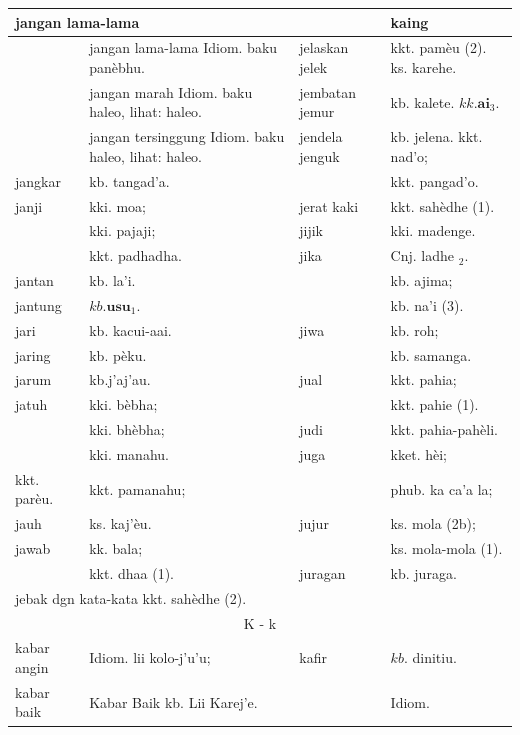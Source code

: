\documentclass[10pt]{article}
\begin{document}
\begin{center}
\begin{tabular}{|l|l|l|l|}
\hline
\multicolumn{3}{|l|}{jangan lama-lama} & kaing \\
\hline
 & jangan lama-lama Idiom. baku panèbhu. & jelaskan jelek & kkt. pamèu (2). ks. karehe. \\
\hline
 & jangan marah Idiom. baku haleo, lihat: haleo. & jembatan jemur & kb. kalete. \(k k . \mathbf{a i}_{3}\). \\
\hline
 & jangan tersinggung Idiom. baku haleo, lihat: haleo. & jendela jenguk & kb. jelena. kkt. nad'o; \\
\hline
jangkar & kb. tangad'a. &  & kkt. pangad'o. \\
\hline
janji & kki. moa; & jerat kaki & kkt. sahèdhe (1). \\
\hline
 & kki. pajaji; & jijik & kki. madenge. \\
\hline
 & kkt. padhadha. & jika & Cnj. ladhe \({ }_{2}\). \\
\hline
jantan & kb. la'i. &  & kb. ajima; \\
\hline
jantung & \(k b . \mathbf{u s u}_{1}\). &  & kb. na'i (3). \\
\hline
jari & kb. kacui-aai. & jiwa & kb. roh; \\
\hline
jaring & kb. pèku. &  & kb. samanga. \\
\hline
jarum & kb.j'aj'au. & jual & kkt. pahia; \\
\hline
jatuh & kki. bèbha; &  & kkt. pahie (1). \\
\hline
\multirow{2}{*}{} & kki. bhèbha; & judi & kkt. pahia-pahèli. \\
\hline
\multirow{2}{*}{} & kki. manahu. & juga & kket. hèi; \\
\hline
kkt. parèu. & kkt. pamanahu; &  & phub. ka ca'a la; \\
\hline
jauh & ks. kaj'èu. & jujur & ks. mola (2b); \\
\hline
jawab & kk. bala; &  & ks. mola-mola (1). \\
\hline
 & kkt. dhaa (1). & juragan & kb. juraga. \\
\hline
\multicolumn{4}{|l|}{\multirow{2}{*}{jebak dgn kata-kata kkt. sahèdhe (2).}} \\
\hline
 &  &  &  \\
\hline
\multicolumn{4}{|c|}{K - k} \\
\hline
kabar angin & Idiom. lii kolo-j'u'u; & kafir & \(k b\). dinitiu. \\
\hline
kabar baik & Kabar Baik kb. Lii Karej'e. &  & Idiom. \\

\end{tabular}
\end{center}
\end{document}
